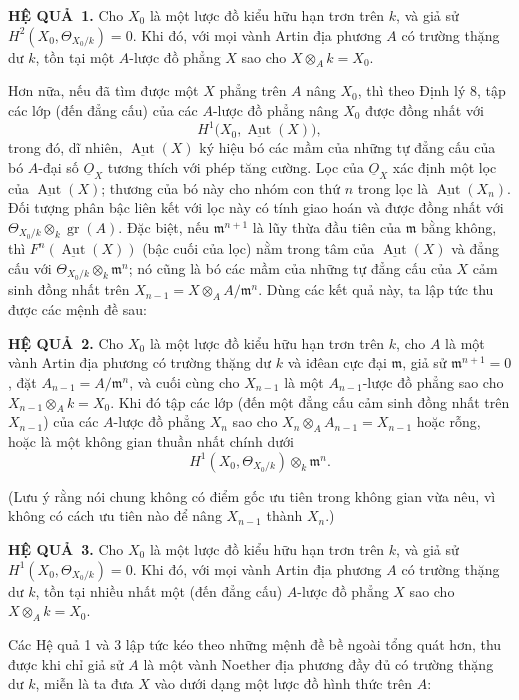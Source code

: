 \documentclass[11pt,twoside,openany]{book}
\numberwithin{equation}{section}
\newcommand{\src}[1]{%
  \phantomsection\hypertarget{src:\fgasourceid:#1}{}%
  \marginpar{\raggedleft\footnotesize\sffamily #1}%
}
\newcommand{\fgasourceid}{unset}
\newcommand{\Osh}{\underline{O}}
\newcommand{\result}[2]{\par\medskip\noindent\textbf{#1\if\relax\detokenize{#2}\relax\else\ #2\fi.}\quad}
\begin{document}
\result{HỆ QUẢ}{1} Cho $X_0$ là một lược đồ kiểu hữu hạn trơn trên $k$, và
giả sử $H^2(X_0,\Theta_{X_0/k})=0$. Khi đó, với mọi vành Artin địa phương
$A$ có trường thặng dư $k$, tồn tại một $A$-lược đồ phẳng $X$ sao
cho $X\otimes_A k=X_0$.

Hơn nữa, nếu đã tìm được một $X$ phẳng trên $A$ nâng $X_0$, thì theo Định lý
8, tập các lớp (đến đẳng cấu) của các $A$-lược đồ phẳng nâng $X_0$ được đồng
nhất với
\[
  H^1\bigl(X_0,\underline{\operatorname{Aut}}(X)\bigr),
\]
trong đó, dĩ nhiên, $\underline{\operatorname{Aut}}(X)$ ký hiệu bó các mầm
của những tự đẳng cấu của bó $A$-đại số $\Osh_X$ tương thích với phép tăng
cường. Lọc của $\Osh_X$ xác định một lọc của
$\underline{\operatorname{Aut}}(X)$; thương của bó này cho nhóm con thứ
$n$ trong lọc là $\underline{\operatorname{Aut}}(X_n)$. Đối tượng phân bậc
liên kết với lọc này có tính giao hoán và được đồng nhất với
$\Theta_{X_0/k}\otimes_k\operatorname{gr}(A)$. Đặc biệt, nếu
$\mathfrak m^{n+1}$ là lũy thừa đầu tiên của $\mathfrak m$ bằng không, thì
$F^n(\underline{\operatorname{Aut}}(X))$ (bậc cuối của lọc) nằm trong tâm của
$\underline{\operatorname{Aut}}(X)$ và đẳng cấu với
$\Theta_{X_0/k}\otimes_k\mathfrak m^n$; nó cũng là bó các mầm của những tự
đẳng cấu của $X$ cảm sinh đồng nhất trên
$X_{n-1}=X\otimes_A A/\mathfrak m^n$. Dùng các kết quả này, ta lập tức thu
được các mệnh đề sau:

\src{205}
\result{HỆ QUẢ}{2} Cho $X_0$ là một lược đồ kiểu hữu hạn trơn trên $k$, cho
$A$ là một vành Artin địa phương có trường thặng dư $k$ và iđêan cực đại
$\mathfrak m$, giả sử $\mathfrak m^{n+1}=0$, đặt
$A_{n-1}=A/\mathfrak m^n$, và cuối cùng cho $X_{n-1}$ là một
$A_{n-1}$-lược đồ phẳng sao cho $X_{n-1}\otimes_A k=X_0$. Khi đó tập các
lớp (đến một đẳng cấu cảm sinh đồng nhất trên $X_{n-1}$) của các $A$-lược đồ
phẳng $X_n$ sao cho $X_n\otimes_A A_{n-1}=X_{n-1}$ hoặc rỗng, hoặc là một
không gian thuần nhất chính dưới
\[
  H^1(X_0,\Theta_{X_0/k})\otimes_k\mathfrak m^n.
\]

(Lưu ý rằng nói chung không có điểm gốc ưu tiên trong không gian vừa nêu, vì
không có cách ưu tiên nào để nâng $X_{n-1}$ thành $X_n$.)

\result{HỆ QUẢ}{3} Cho $X_0$ là một lược đồ kiểu hữu hạn trơn trên $k$, và
giả sử $H^1(X_0,\Theta_{X_0/k})=0$. Khi đó, với mọi vành Artin địa phương
$A$ có trường thặng dư $k$, tồn tại nhiều nhất một (đến đẳng cấu) $A$-lược đồ
phẳng $X$ sao cho $X\otimes_A k=X_0$.

Các Hệ quả 1 và 3 lập tức kéo theo những mệnh đề bề ngoài tổng quát hơn, thu
được khi chỉ giả sử $A$ là một vành Noether địa phương đầy đủ có trường thặng
dư $k$, miễn là ta đưa $X$ vào dưới dạng một lược đồ hình thức trên $A$:
\end{document}
